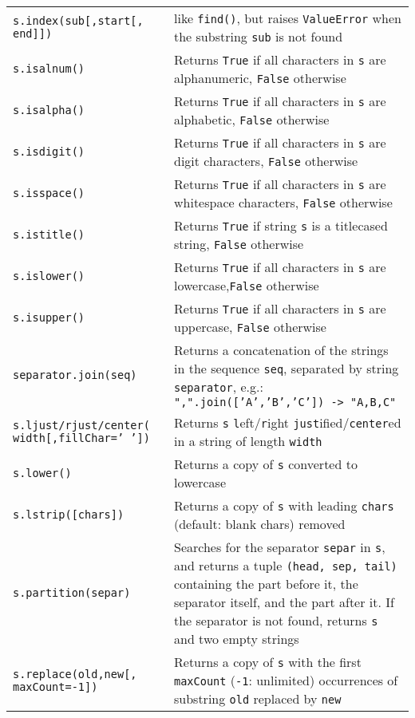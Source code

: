 \begin{longtable}{|p{5cm}|p{10cm}|}
\tt s.index(sub[,start[,\newline
\mbox{}\hfill end]]) 			& like {\tt find()}, but raises {\tt ValueError} when the substring {\tt sub} is not found\\	
\tt s.isalnum() 			& Returns {\tt True} if all characters in {\tt s} are alphanumeric, {\tt False} otherwise\\ 	
\tt s.isalpha() 			& Returns {\tt True} if all characters in {\tt s} are alphabetic, {\tt False} otherwise\\	
\tt s.isdigit() 			& Returns {\tt True} if all characters in {\tt s} are digit characters, {\tt False} otherwise\\ 	
\tt s.isspace() 			& Returns {\tt True} if all characters in {\tt s} are whitespace characters, {\tt False} otherwise\\ 	
\tt s.istitle() 				& Returns {\tt True} if string {\tt s} is a titlecased string, {\tt False} otherwise\\
\tt s.islower() 				& Returns {\tt True} if all characters in {\tt s} are lowercase,{\tt False} otherwise\\ 	
\tt s.isupper() 				& Returns {\tt True} if all characters in {\tt s} are uppercase, {\tt False} otherwise\\ 	
\tt separator.join(seq) 			& Returns a concatenation of the strings in the sequence {\tt seq}, separated by string {\tt separator}, 
                                 		  e.g.: {\tt ",".join(['A','B','C']) -> "A,B,C"}\\ 	
\tt s.ljust/rjust/center(\newline
\mbox{}\hfill width[,fillChar=' ']) 		& Returns {\tt s} {\tt l}eft/{\tt r}ight {\tt just}ified/{\tt center}ed in a string of length {\tt width}\\ 	
\tt s.lower() 					& Returns a copy of {\tt s} converted to lowercase\\ 	
\tt s.lstrip([chars]) 				& Returns a copy of {\tt s} with leading {\tt chars} (default: blank chars) removed\\ 	
\tt s.partition(separ) 				& Searches for the separator {\tt separ} in {\tt s}, and returns a tuple {\tt (head, sep, tail)} 
			 			  containing the part before it, the separator itself, and the part after it. 
			 			  If the separator is not found, returns {\tt s} and two empty strings\\ 	
\tt s.replace(old,new[,\newline
\mbox{}\hfill maxCount=-1]) 			& Returns a copy of {\tt s} with the first {\tt maxCount} 
						  ({\tt -1}: unlimited) occurrences of substring {\tt old} replaced by {\tt new}\\ 	

\end{longtable}
